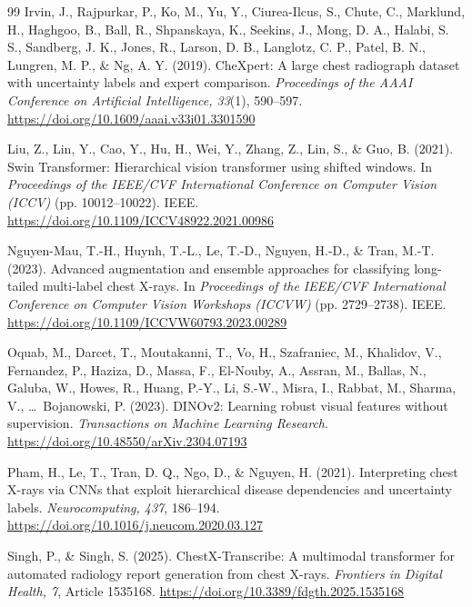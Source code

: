 \documentclass[conference]{IEEEtran}
\begin{document}
\begin{thebibliography}{99}
Irvin, J., Rajpurkar, P., Ko, M., Yu, Y., Ciurea-Ilcus, S., Chute, C., Marklund, H., Haghgoo, B., Ball, R., Shpanskaya, K., Seekins, J., Mong, D. A., Halabi, S. S., Sandberg, J. K., Jones, R., Larson, D. B., Langlotz, C. P., Patel, B. N., Lungren, M. P., \& Ng, A. Y. (2019).
CheXpert: A large chest radiograph dataset with uncertainty labels and expert comparison.
\textit{Proceedings of the AAAI Conference on Artificial Intelligence, 33}(1), 590--597.
\url{https://doi.org/10.1609/aaai.v33i01.3301590}

Liu, Z., Lin, Y., Cao, Y., Hu, H., Wei, Y., Zhang, Z., Lin, S., \& Guo, B. (2021).
Swin Transformer: Hierarchical vision transformer using shifted windows.
In \textit{Proceedings of the IEEE/CVF International Conference on Computer Vision (ICCV)} (pp. 10012--10022). IEEE.
\url{https://doi.org/10.1109/ICCV48922.2021.00986}

Nguyen-Mau, T.-H., Huynh, T.-L., Le, T.-D., Nguyen, H.-D., \& Tran, M.-T. (2023).
Advanced augmentation and ensemble approaches for classifying long-tailed multi-label chest X-rays.
In \textit{Proceedings of the IEEE/CVF International Conference on Computer Vision Workshops (ICCVW)} (pp. 2729--2738). IEEE.
\url{https://doi.org/10.1109/ICCVW60793.2023.00289}

Oquab, M., Darcet, T., Moutakanni, T., Vo, H., Szafraniec, M., Khalidov, V., Fernandez, P., Haziza, D., Massa, F., El-Nouby, A., Assran, M., Ballas, N., Galuba, W., Howes, R., Huang, P.-Y., Li, S.-W., Misra, I., Rabbat, M., Sharma, V., \ldots\ Bojanowski, P. (2023).
DINOv2: Learning robust visual features without supervision.
\textit{Transactions on Machine Learning Research}.
\url{https://doi.org/10.48550/arXiv.2304.07193}

Pham, H., Le, T., Tran, D. Q., Ngo, D., \& Nguyen, H. (2021).
Interpreting chest X-rays via CNNs that exploit hierarchical disease dependencies and uncertainty labels.
\textit{Neurocomputing, 437}, 186--194.
\url{https://doi.org/10.1016/j.neucom.2020.03.127}

Singh, P., \& Singh, S. (2025).
ChestX-Transcribe: A multimodal transformer for automated radiology report generation from chest X-rays.
\textit{Frontiers in Digital Health, 7}, Article 1535168.
\url{https://doi.org/10.3389/fdgth.2025.1535168}


\end{thebibliography}
\end{document}
